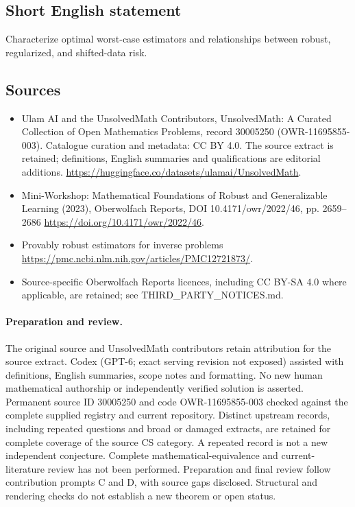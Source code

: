 \documentclass[11pt]{article}
\begin{document}
\subsection{Short English statement}
Characterize optimal worst-case estimators and relationships between robust, regularized, and shifted-data risk.
\subsection{Sources}
\begin{itemize}
\item[\hypertarget{source:30005250:1}{S1}] Ulam AI and the UnsolvedMath Contributors, UnsolvedMath: A Curated Collection of Open Mathematics Problems, record 30005250 (OWR-11695855-003). Catalogue curation and metadata: CC BY 4.0. The source extract is retained; definitions, English summaries and qualifications are editorial additions.
\url{https://huggingface.co/datasets/ulamai/UnsolvedMath}.
\item[\hypertarget{source:30005250:2}{S2}] Mini-Workshop: Mathematical Foundations of Robust and Generalizable Learning (2023), Oberwolfach Reports, DOI 10.4171/owr/2022/46, pp. 2659--2686
\url{https://doi.org/10.4171/owr/2022/46}.
\item[\hypertarget{source:30005250:3}{S3}] Provably robust estimators for inverse problems
\url{https://pmc.ncbi.nlm.nih.gov/articles/PMC12721873/}.
\item Source-specific Oberwolfach Reports licences, including CC BY-SA 4.0 where applicable, are retained; see THIRD\_PARTY\_NOTICES.md.
\end{itemize}
\paragraph{Preparation and review.}
The original source and UnsolvedMath contributors retain attribution for the source extract. Codex (GPT-6; exact serving revision not exposed) assisted with definitions, English summaries, scope notes and formatting. No new human mathematical authorship or independently verified solution is asserted. Permanent source ID 30005250 and code OWR-11695855-003 checked against the complete supplied registry and current repository. Distinct upstream records, including repeated questions and broad or damaged extracts, are retained for complete coverage of the source CS category. A repeated record is not a new independent conjecture. Complete mathematical-equivalence and current-literature review has not been performed. Preparation and final review follow contribution prompts C and D, with source gaps disclosed. Structural and rendering checks do not establish a new theorem or open status.
\label{end:30005250}
\end{document}
